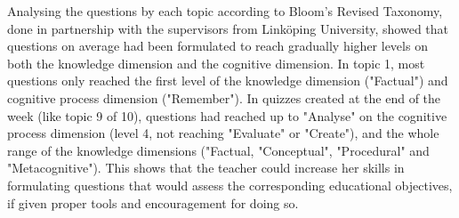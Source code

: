 


Analysing the questions by each topic according to Bloom's Revised Taxonomy, done in partnership with the supervisors from Linköping University, showed that questions on average had been formulated to reach gradually higher levels on both the knowledge dimension and the cognitive dimension. In topic 1, most questions only reached the first level of the knowledge dimension ("Factual") and cognitive process dimension ("Remember"). In quizzes created at the end of the week (like topic 9 of 10), questions had reached up to "Analyse" on the cognitive process dimension (level 4, not reaching "Evaluate" or "Create"), and the whole range of the knowledge dimensions ("Factual, "Conceptual", "Procedural" and "Metacognitive"). This shows that the teacher could increase her skills in formulating questions that would assess the corresponding educational objectives, if given proper tools and encouragement for doing so.
